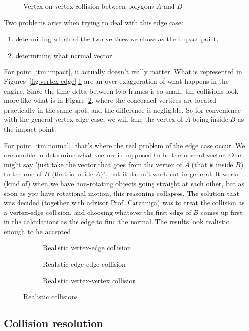 \begin{figure}[H]
	\centering
	\caption{Vertex on vertex collision between polygons $A$ and $B$}
	\label{fig:vertex-vertex}
\end{figure}

\noindent
Two problems arise when trying to deal with this edge case:
\begin{enumerate}
	\item determining which of the two vertices we chose as the impact point;
	      \label{itm:impact}
	\item determining what normal vector.
	      \label{itm:normal}
\end{enumerate}

For point \ref{itm:impact}, it actually doesn't really matter. What is
represented in Figures~\ref{fig:vertex-edge}-\ref{fig:vertex-vertex} are an
over exaggeration of what happens in the engine. Since the time delta between
two frames is so small, the collisions look more like what is in
Figure~\ref{fig:real-vertex-vertex}, where the concerned vertices are located
practically in the same spot, and the difference is negligible. So for convenience
with the general vertex-edge case, we will take the vertex of $A$ being inside
$B$ as the impact point.

For point \ref{itm:normal}, that's where the real problem of the edge case
occur. We are unable to determine what vectors is supposed to be the normal
vector. One might say "just take the vector that goes from the vertex of $A$
(that is inside $B$) to the one of $B$ (that is inside $A$)", but it doesn't
work out in general. It works (kind of) when we have non-rotating objects going
straight at each other, but as soon as you have rotational motion, this
reasoning collapses. The solution that was decided (together with advisor Prof.
Carzaniga) was to treat the collision as a vertex-edge collision, and choosing
whatever the first edge of $B$ comes up first in the calculations as the edge to
find the normal. The results look realistic enough to be accepted.


\begin{figure}[H]
	\centering
	\begin{subfigure}[]{.33\textwidth}
		\centering
		\caption{Realistic vertex-edge collision}
	\end{subfigure}
	\begin{subfigure}[]{.32\textwidth}
		\centering
		\caption{Realistic edge-edge collision}
	\end{subfigure}
	\begin{subfigure}[]{.34\textwidth}
		\centering
		\caption{Realistic vertex-vertex collision}
		\label{fig:real-vertex-vertex}
	\end{subfigure}
	\caption{Realistic collisions}
	\label{fig:real-collisions}
\end{figure}

\subsection{Collision resolution}
\label{sub:resolution}
